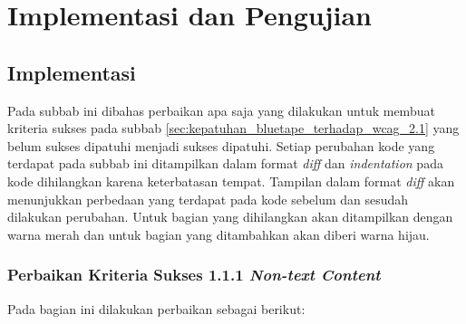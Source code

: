 \chapter{Implementasi dan Pengujian}
\label{chap:implementasi_dan_pengujian}

\section{Implementasi}
\label{sec:implementasi}
Pada subbab ini dibahas perbaikan apa saja yang dilakukan untuk membuat kriteria sukses pada subbab \ref{sec:kepatuhan_bluetape_terhadap_wcag_2.1}
yang belum sukses dipatuhi menjadi sukses dipatuhi. Setiap perubahan kode yang terdapat pada subbab ini ditampilkan dalam format \textit{diff} dan \textit{indentation} pada kode dihilangkan karena keterbatasan tempat. Tampilan dalam format \textit{diff} akan menunjukkan perbedaan yang terdapat pada kode sebelum dan sesudah dilakukan perubahan. Untuk bagian yang dihilangkan akan ditampilkan dengan warna merah dan untuk bagian yang ditambahkan akan diberi warna hijau.

\subsection{Perbaikan Kriteria Sukses 1.1.1 \textit{Non-text Content}}
\label{subsec:perbaikan_kriteria_sukses_1.1.1}
Pada bagian ini dilakukan perbaikan sebagai berikut:

